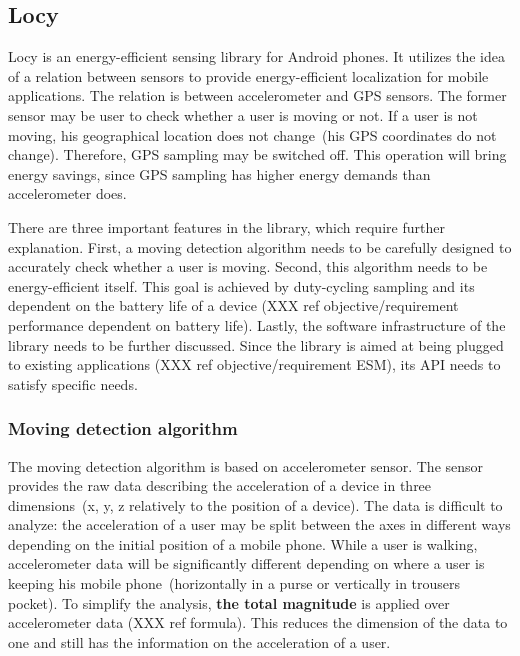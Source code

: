 \subsection{Locy}
\label{s:design:locy}
\hspace{10pt}Locy is an energy-efficient sensing library for Android phones. It utilizes the idea of a relation between sensors to provide energy-efficient localization for mobile applications. The relation is between accelerometer and GPS sensors. The former sensor may be user to check whether a user is moving or not. If a user is not moving, his geographical location does not change\ (his GPS coordinates do not change). Therefore, GPS sampling may be switched off. This operation will bring energy savings, since GPS sampling has higher energy demands than accelerometer does. 

There are three important features in the library, which require further explanation. First, a moving detection algorithm needs to be carefully designed to accurately check whether a user is moving. Second, this algorithm needs to be energy-efficient itself. This goal is achieved by duty-cycling sampling and its dependent on the battery life of a device (XXX ref objective/requirement performance dependent on battery life). Lastly, the software infrastructure of the library needs to be further discussed. Since the library is aimed at being plugged to existing applications (XXX ref objective/requirement ESM), its API needs to satisfy specific needs. 

\subsubsection{Moving detection algorithm}
\label{s:design:locy:moving}
\hspace{10pt}The moving detection algorithm is based on accelerometer sensor. The sensor provides the raw data describing the acceleration of a device in three dimensions\ (x, y, z relatively to the position of a device).  The data is difficult to analyze: the acceleration of a user may be split between the axes in different ways depending on the initial position of a mobile phone. While a user is walking, accelerometer data will be significantly different depending on where a user is keeping his mobile phone\ (horizontally in a purse or vertically in trousers pocket). To simplify the analysis, \textbf{the total magnitude} is applied over accelerometer data (XXX ref formula). This reduces the dimension of the data to one and still has the information on the acceleration of a user. 

